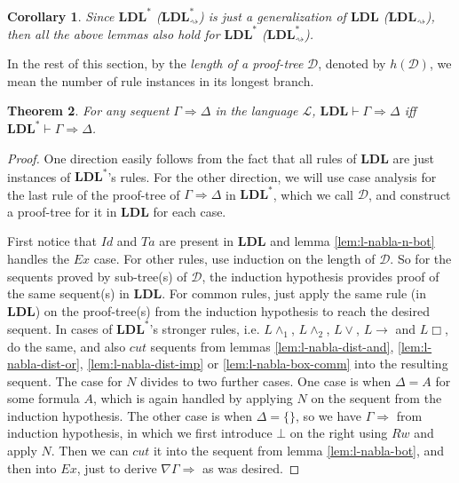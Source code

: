 \documentclass[12pt,a4paper]{article}
\theoremstyle{plain}
\newtheorem{thm}{Theorem}[section]
\newtheorem{cor}[thm]{Corollary}
\theoremstyle{definition}
\begin{document}
\begin{cor}
	Since $\mathbf{LDL}^*$ ($\mathbf{LDL}^*_{\rightsquigarrow}$) is just a generalization of $\mathbf{LDL}$ ($\mathbf{LDL}_{\rightsquigarrow}$), then all the above lemmas also hold for $\mathbf{LDL}^*$ ($\mathbf{LDL}^*_{\rightsquigarrow}$).
\end{cor}

In the rest of this section, by the \emph{length of a proof-tree} $\mathcal{D}$, denoted by $h(\mathcal{D})$, we mean the number of rule instances in its longest branch.

\begin{thm}\label{thm:ldl-eq-ldls}
	For any sequent $\Gamma \Rightarrow \Delta$ in the language $\mathcal{L}$, $\mathbf{LDL} \vdash \Gamma \Rightarrow \Delta$ iff $\mathbf{LDL}^* \vdash \Gamma \Rightarrow \Delta$.
\end{thm}
\begin{proof}
	One direction easily follows from the fact that all rules of $\mathbf{LDL}$ are just instances of $\mathbf{LDL}^*$'s rules.
	For the other direction, we will use case analysis for the last rule of the proof-tree of $\Gamma \Rightarrow \Delta$ in $\mathbf{LDL}^*$, which we call $\mathcal{D}$, and construct a proof-tree for it in $\mathbf{LDL}$ for each case.
	
	First notice that $Id$ and $Ta$ are present in $\mathbf{LDL}$ and lemma \ref{lem:l-nabla-n-bot} handles the $Ex$ case.
	For other rules, use induction on the length of $\mathcal{D}$.
	So for the sequents proved by sub-tree(s) of $\mathcal{D}$, the induction hypothesis provides proof of the same sequent(s) in $\mathbf{LDL}$.
	For common rules, just apply the same rule (in $\mathbf{LDL}$) on the proof-tree(s) from the induction hypothesis to reach the desired sequent.
	In cases of $\mathbf{LDL}^*$'s stronger rules, i.e. $L\land_1$, $L\land_2$, $L\lor$, $L\rightarrow$ and $L\Box$, do the same, and also $cut$ sequents from lemmas \ref{lem:l-nabla-dist-and}, \ref{lem:l-nabla-dist-or}, \ref{lem:l-nabla-dist-imp} or \ref{lem:l-nabla-box-comm} into the resulting sequent.
	The case for $N$ divides to two further cases. One case is when $\Delta = A$ for some formula $A$, which is again handled by applying $N$ on the sequent from the induction hypothesis.
	The other case is when $\Delta = \{\}$, so we have $\Gamma \Rightarrow$ from induction hypothesis, in which we first introduce $\bot$ on the right using $Rw$ and apply $N$.
	Then we can $cut$ it into the sequent from lemma \ref{lem:l-nabla-bot}, and then into $Ex$, just to derive $\nabla \Gamma \Rightarrow$ as was desired.
\end{proof}
\end{document}
